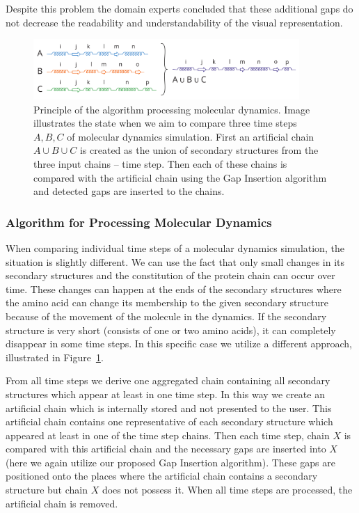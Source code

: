 \documentclass[twocolumn]{bmcart}%
\begin{document}
Despite this problem the domain experts concluded that these additional gaps do not decrease the readability and understandability of the visual representation.

\begin{figure}[thb]
  \centering
  \includegraphics[width=0.9\textwidth]{pics/second.pdf}
  \caption{Principle of the algorithm processing molecular dynamics. Image illustrates the state when we aim to compare three time steps $A, B, C$ of molecular dynamics simulation. First an artificial chain $A \cup B \cup C$ is created as the union of secondary structures from the three input chains -- time step. Then each of these chains is compared with the artificial chain using the Gap Insertion algorithm and detected gaps are inserted to the chains.}
  \label{fig:alg2}
\end{figure}

\subsubsection*{Algorithm for Processing Molecular Dynamics}
When comparing individual time steps of a molecular dynamics simulation, the situation is slightly different. 
We can use the fact that only small changes in its secondary structures and the constitution of the protein chain can occur over time.
These changes can happen at the ends of the secondary structures where the amino acid can change its membership to the given secondary structure because of the movement of the molecule in the dynamics.
If the secondary structure is very short (consists of one or two amino acids), it can completely disappear in some time steps.
In this specific case we utilize a different approach, illustrated in Figure~\ref{fig:alg2}.

From all time steps we derive one aggregated chain containing all secondary structures which appear at least in one time step. 
In this way we create an artificial chain which is internally stored and not presented to the user.
This artificial chain contains one representative of each secondary structure which appeared at least in one of the time step chains.
Then each time step, chain $X$ is compared with this artificial chain and the necessary gaps are inserted into $X$ (here we again utilize our proposed Gap Insertion algorithm).
These gaps are positioned onto the places where the artificial chain contains a secondary structure but chain $X$ does not possess it. 
When all time steps are processed, the artificial chain is removed.
\end{document}
